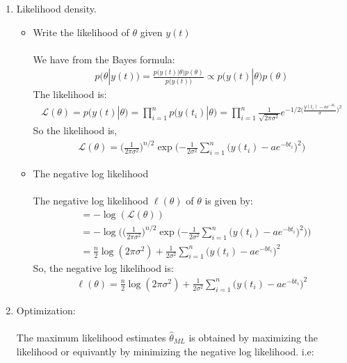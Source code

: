 \documentclass[11pt,a4paper]{article}
\begin{document}
\begin{enumerate}
\item Likelihood density.
   \begin{itemize}
     	\item Write the likelihood of $ \theta $ given $ y(t) $\\\\
     	We have from the Bayes formula:
     	\begin{align*}
     		p(\theta|y(t)) = \frac{p\big(y(t)|\theta\big)p(\theta)}{p\big(y(t)\big)}\propto p\big(y(t)|\theta\big)p(\theta)
     	\end{align*}
     The likelihood is:\begin{align*}
     	\mathcal{L}(\theta) = p\big(y(t)|\theta\big) = \prod_{i=1}^{n} p\big(y({t_i})|\theta\big) = \prod_{i=1}^{n} \frac{1}{\sqrt{2\pi\sigma^{2}}}e^{-1/2\big(\frac{y(t_i)-ae^{-bt_i}}{\sigma}\big)^{2}} 
     \end{align*}
 So the likelihood is, \begin{align*}
 	\boxed{	\mathcal{L}(\theta)  = \bigg(\frac{1}{2\pi\sigma^{2}}\bigg)^{n/2}\exp\bigg({-\frac{1}{2\sigma^{2}}\sum_{i=1}^{n}\big(y(t_i)-ae^{-bt_i}\big)^{2}}\bigg)}
 \end{align*}
\item The negative log likelihood\\\\
The negative log likelihood $ \ell(\theta)$ of $ \theta $ is given by: \begin{align*}
	 &= -\log(\mathcal{L}(\theta))\\
	& = -\log\bigg(\bigg(\frac{1}{2\pi\sigma^{2}}\bigg)^{n/2}\exp\bigg({-\frac{1}{2\sigma^{2}}\sum_{i=1}^{n}\big(y(t_i)-ae^{-bt_i}\big)^{2}}\bigg) \bigg)\\
	& = \frac{n}{2}\log(2\pi\sigma^{2})+\frac{1}{2\sigma^{2}}\sum_{i=1}^{n}\big(y(t_i)-ae^{-bt_i}\big)^{2}
\end{align*} 
So, the negative log likelihood is:
\begin{align*}
	\boxed{\ell(\theta) = \frac{n}{2}\log(2\pi\sigma^{2})+\frac{1}{2\sigma^{2}}\sum_{i=1}^{n}\big(y(t_i)-ae^{-bt_i}\big)^{2}}
\end{align*}
   \end{itemize}
\item Optimization:\\\\ The maximum likelihood estimates $ \hat{\theta}_{ML} $ is obtained by maximizing the likelihood or equivantly by minimizing the negative log likelihood. i.e:

\end{enumerate}
\end{document}

